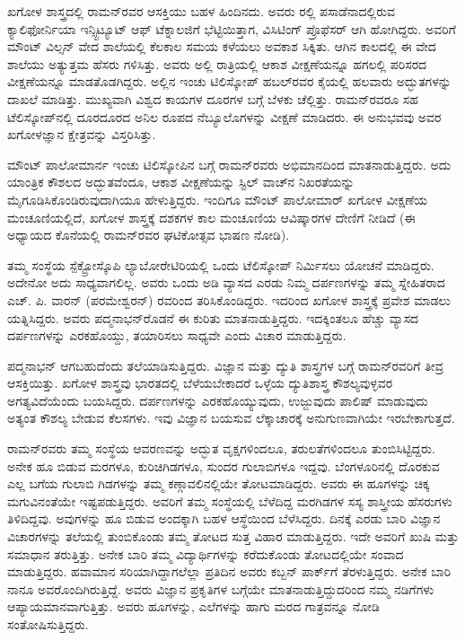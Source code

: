 ಖಗೋಳ ಶಾಸ್ತ್ರದಲ್ಲಿ ರಾಮನ್‌ರವರ ಆಸಕ್ತಿಯು ಬಹಳ ಹಿಂದಿನದು. ಅವರು  ರಲ್ಲಿ ಪಸಾಡೆನಾದಲ್ಲಿರುವ ಕ್ಯಾಲಿಫೋರ್ನಿಯಾ ಇನ್ಸ್ಟಿಟ್ಯೂಟ್ ಆಫ್ ಟೆಕ್ನಾಲಜಿಗೆ ಭೆಟ್ಟಿಯಿತ್ತಾಗ, ವಿಸಿಟಿಂಗ್ ಪ್ರೊಫೆಸರ್ ಆಗಿ ಹೋಗಿದ್ದರು. ಅವರಿಗೆ ಮೌಂಟ್ ವಿಲ್ಸನ್ ವೇದ ಶಾಲೆಯಲ್ಲಿ ಕೆಲಕಾಲ ಸಮಯ ಕಳೆಯಲು ಅವಕಾಶ ಸಿಕ್ಕಿತು. ಆಗಿನ ಕಾಲದಲ್ಲಿ ಈ ವೇದ ಶಾಲೆಯು ಅತ್ಯುತ್ತಮ ಹೆಸರು ಗಳಿಸಿತ್ತು. ಅವರು ಅಲ್ಲಿ ರಾತ್ರಿಯಲ್ಲಿ ಆಕಾಶ ವೀಕ್ಷಣೆಯನ್ನೂ ಹಗಲಲ್ಲಿ ಪರಿಸರದ ವೀಕ್ಷಣೆಯನ್ನೂ ಮಾಡತೊಡಗಿದ್ದರು. ಅಲ್ಲಿನ  ಇಂಚು ಟಿಲಿಸ್ಕೋಪ್ ಹಬಲ್‌ರವರ ಕೈಯಲ್ಲಿ ಹಲವಾರು ಅದ್ಭುತಗಳನ್ನು ದಾಖಲೆ ಮಾಡಿತ್ತು. ಮುಖ್ಯವಾಗಿ ವಿಶ್ವದ ಕಾಯಗಳ ದೂರಗಳ ಬಗ್ಗೆ ಬೆಳಕು ಚೆಲ್ಲಿತ್ತು. ರಾಮನ್‌ರವರೂ ಸಹ ಟೆಲಿಸ್ಕೋಪ್‌ನಲ್ಲಿ ದೂರದೂರದ ಅನಿಲ ರೂಪದ ನೆಬ್ಯೂಲೊಗಳನ್ನು ವೀಕ್ಷಣೆ ಮಾಡಿದರು. ಈ ಅನುಭವವು ಅವರ ಖಗೋಳಜ್ಞಾನ ಕ್ಷೇತ್ರವನ್ನು ವಿಸ್ತರಿಸಿತ್ತು.

ಮೌಂಟ್ ಪಾಲೋಮಾರ್ನ  ಇಂಚು ಟಿಲಿಸ್ಕೋಪಿನ ಬಗ್ಗೆ ರಾಮನ್‌ರವರು ಅಭಿಮಾನದಿಂದ ಮಾತನಾಡುತ್ತಿದ್ದರು. ಅದು ಯಾಂತ್ರಿಕ ಕೌಶಲದ ಅದ್ಭುತವೆಂದೂ, ಆಕಾಶ ವೀಕ್ಷಣೆಯನ್ನು ಸ್ಟಿಲ್ ವಾಚ್‍ನ ನಿಖರತೆಯನ್ನು ಮೈಗೂಡಿಸಿಕೊಂಡಿರುವುದಾಗಿಯೂ ಹೇಳುತ್ತಿದ್ದರು. ಇಂದಿಗೂ ಮೌಂಟ್ ಪಾಲೋಮಾರ್ ಖಗೋಳ ವೀಕ್ಷಣೆಯ ಮಂಚೂಣಿಯಲ್ಲಿದೆ, ಖಗೋಳ ಶಾಸ್ತ್ರಕ್ಕೆ ದಶಕಗಳ ಕಾಲ ಮಂಚೂಣಿಯ ಆವಿಷ್ಕಾರಗಳ ದೇಣಿಗೆ ನೀಡಿದೆ (ಈ ಅಧ್ಯಾಯದ ಕೊನೆಯಲ್ಲಿ ರಾಮನ್‌ರವರ ಘಟಿಕೋತ್ಸವ ಭಾಷಣ ನೋಡಿ).

ತಮ್ಮ ಸಂಸ್ಥೆಯ ಸ್ಪೆಕ್ಟ್ರೋಸ್ಕೊಪಿ ಲ್ಯಾಬೋರೇಟಿರಿಯಲ್ಲಿ ಒಂದು ಟೆಲಿಸ್ಕೋಪ್ ನಿರ್ಮಿಸಲು ಯೋಚನೆ ಮಾಡಿದ್ದರು. ಅದೇನೋ ಅದು ಸಾಧ್ಯವಾಗಲಿಲ್ಲ. ಅವರು ಒಂದು ಅಡಿ ವ್ಯಾಸದ ಎರಡು ನಿಮ್ಮ ದರ್ಪಣಗಳನ್ನು ತಮ್ಮ ಸ್ನೇಹಿತರಾದ ಎಚ್. ಪಿ. ವಾರನ್ (ಪರಮೇಶ್ವರನ್) ರವರಿಂದ ತರಿಸಿಕೊಂಡಿದ್ದರು. ಇದರಿಂದ ಖಗೋಳ ಶಾಸ್ತ್ರಕ್ಕೆ ಪ್ರವೇಶ ಮಾಡಲು ಯತ್ನಿಸಿದ್ದರು. ಅವರು ಪದ್ಮನಾಭನ್‌ರೊಡನೆ ಈ ಕುರಿತು ಮಾತನಾಡುತ್ತಿದ್ದರು. ಇದಕ್ಕಿಂತಲೂ ಹೆಚ್ಚು ವ್ಯಾಸದ ದರ್ಪಣಗಳನ್ನು ಎರಕಹೊಯ್ದು, ತಯಾರಿಸಲು ಸಾಧ್ಯವೇ ಎಂದು ವಿಚಾರ ಮಾಡುತ್ತಿದ್ದರು. 

ಪದ್ಮನಾಭನ್ ಆಗಬಹುದೆಂದು ತಲೆಯಾಡಿಸುತ್ತಿದ್ದರು. ವಿಜ್ಞಾನ ಮತ್ತು ದ್ಯುತಿ ಶಾಸ್ತ್ರಗಳ ಬಗ್ಗೆ ರಾಮನ್‍ರವರಿಗೆ ತೀವ್ರ ಆಸಕ್ತಿಯಿತ್ತು. ಖಗೋಳ ಶಾಸ್ತ್ರವು ಭಾರತದಲ್ಲಿ ಬೆಳೆಯಬೇಕಾದರೆ ಒಳ್ಳೆಯ ದ್ಯುತಿಶಾಸ್ತ್ರ ಕೌಶಲ್ಯವುಳ್ಳವರ ಅಗತ್ಯವಿದೆಯೆಂದು ಬಯಸಿದ್ದರು. ದರ್ಪಣಗಳನ್ನು ಎರಕಹೊಯ್ಯುವುದು, ಉಜ್ಜುವುದು ಪಾಲಿಷ್ ಮಾಡುವುದು ಅತ್ಯಂತ ಕೌಶಲ್ಯ ಬೇಡುವ ಕೆಲಸಗಳು. ಇವು ವಿಜ್ಞಾನ ಬಯಸುವ ಲೆಕ್ಕಾಚಾರಕ್ಕೆ ಅನುಗುಣವಾಗಿಯೇ ಇರಬೇಕಾಗುತ್ತದೆ.

ರಾಮನ್‌ರವರು ತಮ್ಮ ಸಂಸ್ಥೆಯ ಆವರಣವನ್ನು ಅದ್ಭುತ ವೃಕ್ಷಗಳಿಂದಲೂ, ತರುಲತೆಗಳಿಂದಲೂ ತುಂಬಿಸಿಟ್ಟಿದ್ದರು. ಅನೇಕ ಹೂ ಬಿಡುವ ಮರಗಳೂ, ಕುರಿಚಿಗಿಡಗಳೂ, ಸುಂದರ ಗುಲಾಬಿಗಳೂ ಇದ್ದವು. ಬೆಂಗಳೂರಿನಲ್ಲಿ ದೊರಕುವ ಎಲ್ಲ ಬಗೆಯ ಗುಲಾಬಿ ಗಿಡಗಳನ್ನು ತಮ್ಮ ಕಣ್ಗಾವಲಿನಲ್ಲಿಯೇ ತೋಟಮಾಡಿದ್ದರು. ಅವರು ಈ ಹೂಗಳನ್ನು ಚಿಕ್ಕ ಮಗುವಿನಂತೆಯೇ ಇಷ್ಟಪಡುತ್ತಿದ್ದರು. ಅವರಿಗೆ ತಮ್ಮ ಸಂಸ್ಥೆಯಲ್ಲಿ ಬೆಳೆದಿದ್ದ ಮರಗಿಡಗಳ ಸಸ್ಯ ಶಾಸ್ತ್ರೀಯ ಹೆಸರುಗಳು ತಿಳಿದಿದ್ದವು. ಅವುಗಳನ್ನು ಹೂ ಬಿಡುವ ಅಂದಕ್ಕಾಗಿ ಬಹಳ ಆಸ್ಥೆಯಿಂದ ಬೆಳೆಸಿದ್ದರು. ದಿನಕ್ಕೆ ಎರಡು ಬಾರಿ ವಿಜ್ಞಾನ ವಿಚಾರಗಳನ್ನು ತಲೆಯಲ್ಲಿ ತುಂಬಿಕೊಂಡು ತಮ್ಮ ತೋಟದ ಸುತ್ತ ವಿಹಾರ ಮಾಡುತ್ತಿದ್ದರು. ಇದೇ ಅವರಿಗೆ ಖುಷಿ ಮತ್ತು ಸಮಾಧಾನ ತರುತ್ತಿತ್ತು. ಅನೇಕ ಬಾರಿ ತಮ್ಮ ವಿದ್ಯಾರ್ಥಿಗಳನ್ನು ಕರೆದುಕೊಂಡು ತೋಟದಲ್ಲಿಯೇ ಸಂವಾದ ಮಾಡುತ್ತಿದ್ದರು. ಹವಾಮಾನ ಸರಿಯಾಗಿದ್ದಾಗಲೆಲ್ಲಾ ಪ್ರತಿದಿನ ಅವರು ಕಬ್ಬನ್ ಪಾರ್ಕ್‌ಗೆ ತೆರಳುತ್ತಿದ್ದರು. ಅನೇಕ ಬಾರಿ ನಾನೂ ಅವರೊಂದಿಗಿರುತ್ತಿದ್ದೆ. ಅವರು ವಿಜ್ಞಾನ ಪ್ರಕೃತಿಗಳ ಬಗ್ಗೆಯೇ ಮಾತನಾಡುತ್ತಿದ್ದುದರಿಂದ ನಮ್ಮ ನಡಿಗೆಗಳು ಆಪ್ಯಾಯಮಾನವಾಗುತ್ತಿತ್ತು. ಅವರು ಹೂಗಳನ್ನು, ಎಲೆಗಳನ್ನು ಹಾಗು ಮರದ ಗಾತ್ರವನ್ನೂ ನೋಡಿ ಸಂತೋಷಿಸುತ್ತಿದ್ದರು. 

